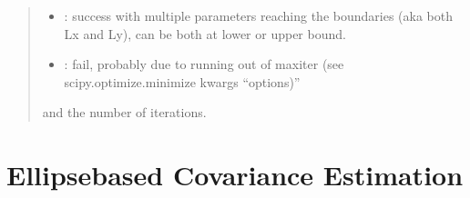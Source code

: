 \documentclass[letterpaper,10pt,english]{sphinxmanual}
\begin{document}
\begin{fulllineitems}
\begin{quote}
\begin{description}
\begin{itemize}
\item {}
: success with multiple parameters reaching the
boundaries (aka both Lx and Ly), can be both at lower or
upper bound.

\item {}
: fail, probably due to running out of maxiter (see
scipy.optimize.minimize kwargs “options)”

\end{itemize}

\sphinxAtStartPar
and the number of iterations.


\sphinxAtStartPar
{}

\end{description}\end{quote}

\end{fulllineitems}



\section{Ellipse\sphinxhyphen{}based Covariance Estimation}
\label{\detokenize{ellipse:ellipse-based-covariance-estimation}}
\end{document}

